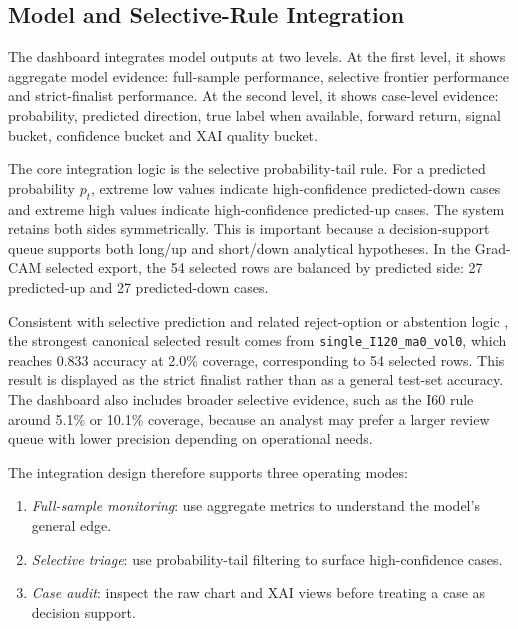 \subsection{Model and Selective-Rule Integration}
\label{subsec:model_selective_integration}

The dashboard integrates model outputs at two levels. At the first level, it shows aggregate model evidence: full-sample performance, selective frontier performance and strict-finalist performance. At the second level, it shows case-level evidence: probability, predicted direction, true label when available, forward return, signal bucket, confidence bucket and XAI quality bucket.

The core integration logic is the selective probability-tail rule. For a predicted probability \(p_t\), extreme low values indicate high-confidence predicted-down cases and extreme high values indicate high-confidence predicted-up cases. The system retains both sides symmetrically. This is important because a decision-support queue supports both long/up and short/down analytical hypotheses. In the Grad-CAM selected export, the 54 selected rows are balanced by predicted side: 27 predicted-up and 27 predicted-down cases.

Consistent with selective prediction and related reject-option or abstention logic \cite{chow_reject,elyaniv_selective,geifman_selective}, the strongest canonical selected result comes from \texttt{single\_I120\_ma0\_vol0}, which reaches 0.833 accuracy at 2.0\% coverage, corresponding to 54 selected rows. This result is displayed as the strict finalist rather than as a general test-set accuracy. The dashboard also includes broader selective evidence, such as the I60 rule around 5.1\% or 10.1\% coverage, because an analyst may prefer a larger review queue with lower precision depending on operational needs.

The integration design therefore supports three operating modes:

\begin{enumerate}
    \item \emph{Full-sample monitoring}: use aggregate metrics to understand the model's general edge.
    \item \emph{Selective triage}: use probability-tail filtering to surface high-confidence cases.
    \item \emph{Case audit}: inspect the raw chart and XAI views before treating a case as decision support.
\end{enumerate}

